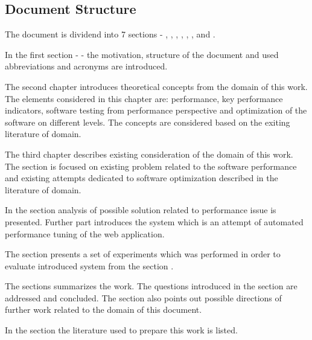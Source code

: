 \documentclass[12pt,a4paper]{article}
\begin{document}
\pagebreak
\subsection{Document Structure}

The document is dividend into 7 sections - 
\textit{}, 
\textit{}, 
\textit{}, 
\textit{}, 
\textit{}, 
\textit{}, 
\textit{} and 
\textit{}. 

In the first section - \textit{} - the motivation, structure of the document and used abbreviations and acronyms are introduced. 

The second chapter \textit{} introduces theoretical concepts from the domain of this work. The elements considered in this chapter are: performance, key performance indicators, software testing from performance perspective and optimization of the software on different levels. The concepts are considered based on the exiting literature of domain. 
  
The third chapter \textit{} describes existing consideration of the domain of this work. The section is focused on existing problem related to the software performance and existing attempts    dedicated to software optimization described in the literature of domain.

In the section \textit{} analysis of possible solution related to performance issue is presented. Further part introduces the system which is an attempt of automated performance tuning of the web application.

The section \textit{} presents a set of experiments which was performed in order to evaluate introduced system from the section \textit{}. 

The \textit{} sections summarizes the work. The questions introduced in the section \textit{} are addressed and concluded. The section also points out possible directions of further work related to the domain of this document. 

In the section \textit{} the literature used to prepare this work is listed.
\end{document}
